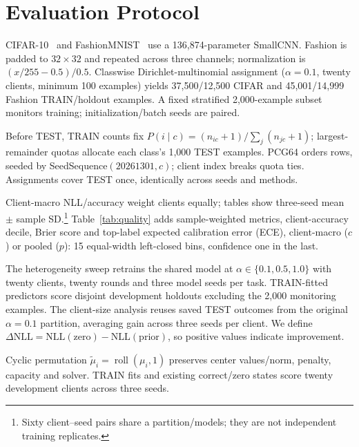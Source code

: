 \section{Evaluation Protocol}
CIFAR-10~\cite{krizhevsky2009tiny} and FashionMNIST~\cite{xiao2017fashion} use a 136,874-parameter SmallCNN. Fashion is padded to $32\times32$ and repeated across three channels; normalization is $(x/255-0.5)/0.5$. Classwise Dirichlet-multinomial assignment ($\alpha=0.1$, twenty clients, minimum 100 examples) yields 37,500/12,500 CIFAR and 45,001/14,999 Fashion TRAIN/holdout examples. A fixed stratified 2,000-example subset monitors training; initialization/batch seeds are paired.

Before TEST, TRAIN counts fix $P(i\mid c)=(n_{ic}+1)/\sum_j(n_{jc}+1)$; largest-remainder quotas allocate each class's 1,000 TEST examples. PCG64 orders rows, seeded by SeedSequence$(20261301,c)$; client index breaks quota ties. Assignments cover TEST once, identically across seeds and methods.

Client-macro NLL/accuracy weight clients equally; tables show three-seed mean $\pm$ sample SD.\footnote{Sixty client--seed pairs share a partition/models; they are not independent training replicates.} Table~\ref{tab:quality} adds sample-weighted metrics, client-accuracy decile, Brier score and top-label expected calibration error (ECE), client-macro ($c$) or pooled ($p$): 15 equal-width left-closed bins, confidence one in the last.

The heterogeneity sweep retrains the shared model at $\alpha\in\{0.1,0.5,1.0\}$ with twenty clients, twenty rounds and three model seeds per task. TRAIN-fitted predictors score disjoint development holdouts excluding the 2,000 monitoring examples. The client-size analysis reuses saved TEST outcomes from the original $\alpha=0.1$ partition, averaging gain across three seeds per client. We define $\Delta\mathrm{NLL}=\mathrm{NLL}(\mathrm{zero})-\mathrm{NLL}(\mathrm{prior})$, so positive values indicate improvement.

Cyclic permutation $\widetilde\mu_i=\operatorname{roll}(\mu_i,1)$ preserves center values/norm, penalty, capacity and solver. TRAIN fits and existing correct/zero states score twenty development clients across three seeds.
